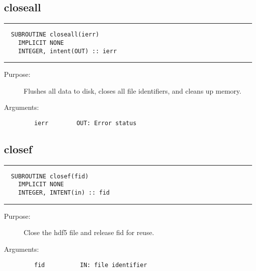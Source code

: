 \documentclass[a4paper]{article}
\begin{document}
\subsection{closeall}

\par
\addvspace{\medskipamount}
\nopagebreak\hrule
\begin{verbatim}
  SUBROUTINE closeall(ierr)
    IMPLICIT NONE
    INTEGER, intent(OUT) :: ierr
\end{verbatim}
\nopagebreak\hrule
\addvspace{\medskipamount}

\begin{description}
\item[Purpose:] \mbox{}

Flushes all data to disk, closes all file identifiers, and cleans
up memory.

\item[Arguments:] \mbox{}

\begin{verbatim}
   ierr        OUT: Error status

\end{verbatim}


\end{description}





\subsection{closef}

\par
\addvspace{\medskipamount}
\nopagebreak\hrule
\begin{verbatim}
  SUBROUTINE closef(fid)
    IMPLICIT NONE
    INTEGER, INTENT(in) :: fid
\end{verbatim}
\nopagebreak\hrule
\addvspace{\medskipamount}

\begin{description}
\item[Purpose:] \mbox{}

Close the hdf5 file and release fid for reuse.

\item[Arguments:] \mbox{}

\begin{verbatim}
   fid          IN: file identifier

\end{verbatim}


\end{description}
\end{document}
